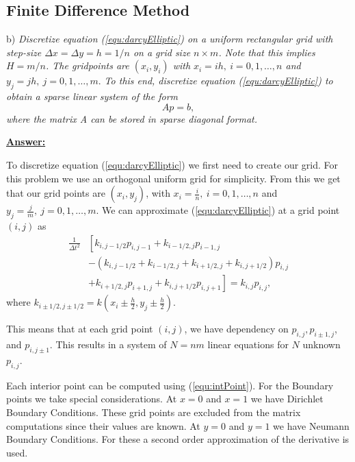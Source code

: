   



%
%
%
\subsection{Finite Difference Method}
b) \textit{Discretize equation (\ref{equ:darcyElliptic}) on a uniform rectangular grid with step-size $\Delta x = \Delta y = h = 1/n$ on a grid size $n \times m$. Note that this implies $H = m/n$. The gridpoints are $(x_i,y_i)$ with $x_i = ih,\ i = 0,1,\ldots, n$ and $y_j = jh,\ j = 0,1,\ldots,m.$ To this end, discretize equation (\ref{equ:darcyElliptic}) to obtain a sparse linear system of the form
\begin{equation}
    A p = b,
\end{equation}
where the matrix A can be stored in sparse diagonal format.}

\vspace{0.3cm}
\noindent \underline{\textbf{Answer:}}

To discretize equation (\ref{equ:darcyElliptic}) we first need to create our grid. For this problem we use an orthogonal uniform grid for simplicity. From this we get that our grid points are $(x_i, y_j)$, with $x_i = \frac{i}{n},\ i = 0,1,\ldots, n$ and  $y_j = \frac{j}{m},\ j = 0,1,\ldots, m$. We can approximate (\ref{equ:darcyElliptic}) at a grid point $(i,j)$ as
\begin{equation} \label{equ:intPoint}
\begin{aligned}
    \frac{1}{\Delta t^2} &\left[ k_{i,j-1/2} p_{i,j-1} + k_{i-1/2,j}  p_{i-1,j} \right. \\
    &- \left( k_{i,j-1/2} +k_{i-1/2,j} + k_{i+1/2,j} + k_{i,j+1/2} \right)  p_{i,j} \\
    &\left.+ k_{i+1/2,j} p_{i+1,j}  + k_{i,j+1/2} p_{i,j+1}  \right] = k_{i,j} p_{i,j},
\end{aligned}
\end{equation}
where $k_{i\pm1/2,j\pm1/2} = k(x_i\pm \frac{h}{2},y_j\pm \frac{h}{2})$.

This means that at each grid point $(i,j)$, we have dependency on $p_{i,j}, p_{i\pm1,j}$, and $p_{i,j\pm1}$. This results in a system of $N = nm$ linear equations for $N$ unknown $p_{i,j}$.

Each interior point can be computed using (\ref{equ:intPoint}). For the Boundary points we take special considerations. At $x = 0$ and $x = 1$ we have Dirichlet Boundary Conditions. These grid points are excluded from the matrix computations since their values are known. At $y=0$ and $y=1$ we have Neumann Boundary Conditions. For these a second order approximation of the derivative is used. 

